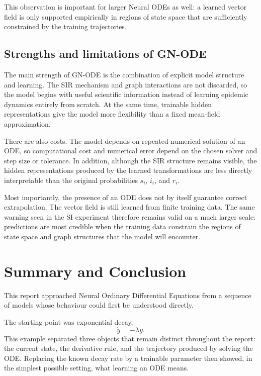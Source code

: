 \documentclass[11pt,a4paper]{article}
\begin{document}
This observation is important for larger Neural ODEs as well: a learned vector
field is only supported empirically in regions of state space that are
sufficiently constrained by the training trajectories.


\subsection{Strengths and limitations of GN-ODE}

The main strength of GN-ODE is the combination of explicit model structure and
learning. The SIR mechanism and graph interactions are not discarded, so the
model begins with useful scientific information instead of learning epidemic
dynamics entirely from scratch. At the same time, trainable hidden
representations give the model more flexibility than a fixed mean-field
approximation.

There are also costs. The model depends on repeated numerical solution of an
ODE, so computational cost and numerical error depend on the chosen solver and
step size or tolerance. In addition, although the SIR structure remains
visible, the hidden representations produced by the learned transformations
are less directly interpretable than the original probabilities
$s_i$, $i_i$, and $r_i$.

Most importantly, the presence of an ODE does not by itself guarantee correct
extrapolation. The vector field is still learned from finite training data.
The same warning seen in the SI experiment therefore remains valid on a much
larger scale: predictions are most credible when the training data constrain
the regions of state space and graph structures that the model will encounter.


\section{Summary and Conclusion}

This report approached Neural Ordinary Differential Equations from a sequence
of models whose behaviour could first be understood directly.

The starting point was exponential decay,
\[
    \dot y=-\lambda y.
\]
This example separated three objects that remain distinct throughout the
report: the current state, the derivative rule, and the trajectory produced by
solving the ODE. Replacing the known decay rate by a trainable parameter then
showed, in the simplest possible setting, what learning an ODE means.
\end{document}
